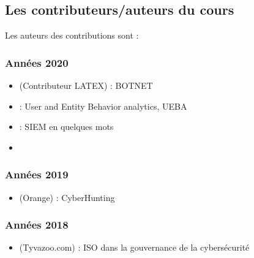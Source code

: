 
\subsection{Les contributeurs/auteurs du cours}

Les auteurs des contributions sont :

\subsubsection{Années 2020}

\begin{itemize}
  \item {}  (Contributeur LATEX) : BOTNET
\end{itemize}

\begin{itemize}
  \item {}  : User and Entity Behavior analytics, UEBA
\end{itemize}

\begin{itemize}
  \item {}  : SIEM en quelques mots
  \item \end{itemize}

\subsubsection{Années 2019}

\begin{itemize}
  \item {} (Orange) : CyberHunting
\end{itemize}

\subsubsection{Années 2018}

\begin{itemize}
  \item {} (Tyvazoo.com) : ISO dans la gouvernance de la cybersécurité
\end{itemize}

